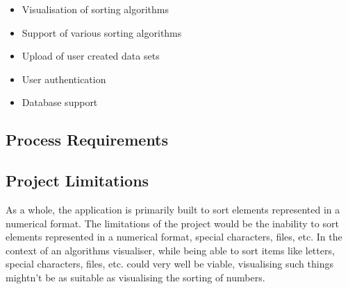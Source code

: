 \begin{itemize}
    \item Visualisation of sorting algorithms
    \item Support of various sorting algorithms
    \item Upload of user created data sets
    \item User authentication
    \item Database support
\end{itemize}

\subsection{Process Requirements}

\subsection{Project Limitations}
As a whole, the application is primarily built to sort elements represented in a
numerical format. The limitations of the project would be the inability to sort 
elements represented in a numerical format, special characters, files, etc. In the context of an algorithms visualiser, while being able to sort items like letters, special characters, files, etc. could very well be viable, visualising such things mightn't be as suitable as visualising the sorting of numbers.